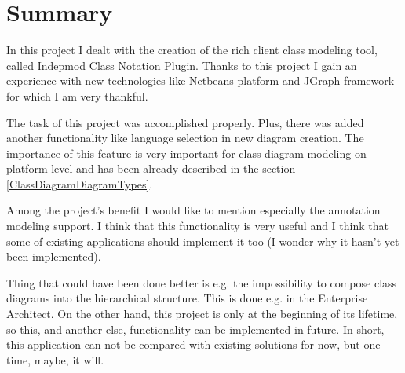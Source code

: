 \section{Summary}

In this project I dealt with the creation of the rich client class modeling tool, called Indepmod Class Notation Plugin. Thanks to this project I gain an experience with new technologies like Netbeans platform and JGraph framework for which I am very thankful. 

The task of this project was accomplished properly. Plus, there was added another functionality like language selection in new diagram creation. The importance of this feature is very important for class diagram modeling on platform level and has been already described in the section \ref{ClassDiagramDiagramTypes}.

Among the project's benefit I would like to mention especially the annotation modeling support. I think that this functionality is very useful and I think that some of existing applications should implement it too (I wonder why it hasn't yet been implemented).

Thing that could have been done better is e.g. the impossibility to compose class diagrams into the hierarchical structure. This is done e.g. in the Enterprise Architect. On the other hand, this project is only at the beginning of its lifetime, so this, and another else, functionality can be implemented in future. In short, this application can not be compared with existing solutions for now, but one time, maybe, it will.
